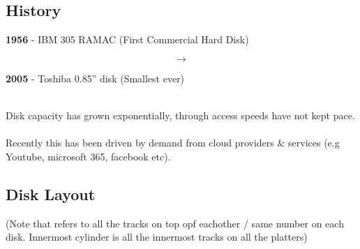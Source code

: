 \documentclass{report}
\begin{document}
\subsection*{History}
\begin{minipage}[t]{0.4\textwidth}
	\textbf{1956} - IBM 305 RAMAC (First Commercial Hard Disk)
\end{minipage}
\begin{minipage}[t]{0.2\textwidth}
	\begin{huge}
		\[\to\]
	\end{huge}
\end{minipage}
\begin{minipage}[t]{0.4\textwidth}
	\textbf{2005} - Toshiba 0.85'' disk (Smallest ever)
\end{minipage}
\\ Disk capacity has grown exponentially, through access speeds have not kept pace.
\\
\\ Recently this has been driven by demand from cloud providers \& services (e.g Youtube, microsoft 365, facebook etc).
\\

\subsection*{Disk Layout}
\begin{minipage}[t]{0.6\textwidth}
	(Note that  refers to all the tracks on top opf eachother / same number on each disk. Innermost cylinder is all the innermost tracks on all the platters)
\end{minipage}
\begin{minipage}[t]{0.4\textwidth}
\end{minipage}
\end{document}
